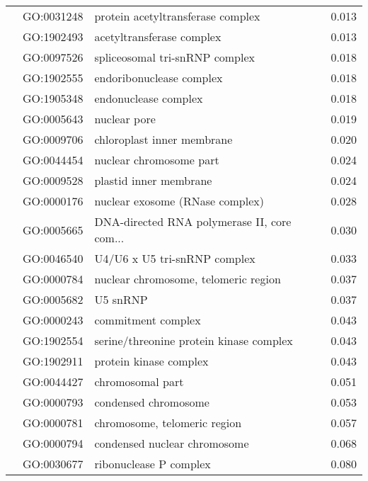 \begin{longtable}{lllr}
   & GO:0031248 &            protein acetyltransferase complex &         0.013 \\
   & GO:1902493 &                    acetyltransferase complex &         0.013 \\
   & GO:0097526 &               spliceosomal tri-snRNP complex &         0.018 \\
   & GO:1902555 &                     endoribonuclease complex &         0.018 \\
   & GO:1905348 &                         endonuclease complex &         0.018 \\
   & GO:0005643 &                                 nuclear pore &         0.019 \\
   & GO:0009706 &                   chloroplast inner membrane &         0.020 \\
   & GO:0044454 &                      nuclear chromosome part &         0.024 \\
   & GO:0009528 &                       plastid inner membrane &         0.024 \\
   & GO:0000176 &              nuclear exosome (RNase complex) &         0.028 \\
   & GO:0005665 &  DNA-directed RNA polymerase II, core com... &         0.030 \\
   & GO:0046540 &                 U4/U6 x U5 tri-snRNP complex &         0.033 \\
   & GO:0000784 &         nuclear chromosome, telomeric region &         0.037 \\
   & GO:0005682 &                                     U5 snRNP &         0.037 \\
   & GO:0000243 &                           commitment complex &         0.043 \\
   & GO:1902554 &      serine/threonine protein kinase complex &         0.043 \\
   & GO:1902911 &                       protein kinase complex &         0.043 \\
   & GO:0044427 &                             chromosomal part &         0.051 \\
   & GO:0000793 &                         condensed chromosome &         0.053 \\
   & GO:0000781 &                 chromosome, telomeric region &         0.057 \\
   & GO:0000794 &                 condensed nuclear chromosome &         0.068 \\
   & GO:0030677 &                       ribonuclease P complex &         0.080 \\

\end{longtable}

